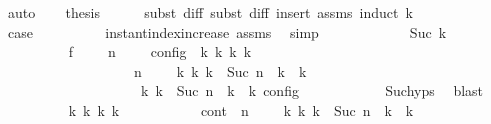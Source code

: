 \begin{isabellebody}
\ auto\isanewline
\ \ \isamarkupfalse%
\ {\isacharquery}thesis\isanewline
\ \ \ \ \isamarkupfalse%
\ {\isacharparenleft}subst\ diff{\isacharcomma}\ subst\ diff{\isacharcomma}\ insert\ assms{\isacharparenleft}{}{\isacharparenright}{\isacharcomma}\ induct\ {\isasymdelta}k{\isacharparenright}\isanewline
\ \ \ \ \ \ \isamarkupfalse%
\ {}\ \ \isamarkupfalse%
\ {\isacharquery}case\isanewline
\ \ \ \ \ \ \ \ \isamarkupfalse%
\ instant{\isacharunderscore}index{\isacharunderscore}increase\ assms{\isacharparenleft}{}{\isacharparenright}\ \isamarkupfalse%
\ simp\isanewline
\ \ \ \ \isamarkupfalse%
\isanewline
\ \ \ \ \ \ \isamarkupfalse%
\ {\isacharparenleft}Suc\ {\isasymdelta}k{\isacharparenright}\isanewline
\ \ \ \ \ \ \ \ \isamarkupfalse%
\ f{}{\isacharcolon}\ {\isacartoucheopen}{\isasymrho}\ {\isasymin}\ {\isasymlbrakk}\ {\isasymGamma}{\isacharcomma}\ n\ {\isasymturnstile}\ {\isasymPsi}\ {\isasymtriangleright}\ {\isasymPhi}\ {\isasymrbrakk}\isactrlsub c\isactrlsub o\isactrlsub n\isactrlsub f\isactrlsub i\isactrlsub g\ {\isasymLongrightarrow}\ {\isasymexists}{\isasymGamma}\isactrlsub k\ {\isasymPsi}\isactrlsub k\ {\isasymPhi}\isactrlsub k\ k{\isachardot}\isanewline
\ \ \ \ \ \ \ \ \ \ \ \ \ \ \ \ \ \ {\isacharparenleft}{\isacharparenleft}{\isasymGamma}{\isacharcomma}\ n\ {\isasymturnstile}\ {\isasymPsi}\ {\isasymtriangleright}\ {\isasymPhi}{\isacharparenright}\ {\isasymhookrightarrow}\isactrlbsup k\isactrlesup \ {\isacharparenleft}{\isasymGamma}\isactrlsub k{\isacharcomma}\ {\isasymdelta}k\ {\isacharplus}\ Suc\ n\ {\isasymturnstile}\ {\isasymPsi}\isactrlsub k\ {\isasymtriangleright}\ {\isasymPhi}\isactrlsub k{\isacharparenright}{\isacharparenright}\isanewline
\ \ \ \ \ \ \ \ \ \ \ \ \ \ \ \ {\isasymand}\ {\isasymrho}\ {\isasymin}\ {\isasymlbrakk}\ {\isasymGamma}\isactrlsub k{\isacharcomma}\ {\isasymdelta}k\ {\isacharplus}\ Suc\ n\ {\isasymturnstile}\ {\isasymPsi}\isactrlsub k\ {\isasymtriangleright}\ {\isasymPhi}\isactrlsub k\ {\isasymrbrakk}\isactrlsub c\isactrlsub o\isactrlsub n\isactrlsub f\isactrlsub i\isactrlsub g{\isacartoucheclose}\isanewline
\ \ \ \ \ \ \ \ \ \ \isamarkupfalse%
\ Suc{\isachardot}hyps\ \isamarkupfalse%
\ blast\isanewline
\ \ \ \ \ \ \ \ \isamarkupfalse%
\ {\isasymGamma}\isactrlsub k\ {\isasymPsi}\isactrlsub k\ {\isasymPhi}\isactrlsub k\ k\isanewline
\ \ \ \ \ \ \ \ \ \ \ cont{\isacharcolon}\ {\isacartoucheopen}{\isacharparenleft}{\isacharparenleft}{\isasymGamma}{\isacharcomma}\ n\ {\isasymturnstile}\ {\isasymPsi}\ {\isasymtriangleright}\ {\isasymPhi}{\isacharparenright}\ {\isasymhookrightarrow}\isactrlbsup k\isactrlesup \ {\isacharparenleft}{\isasymGamma}\isactrlsub k{\isacharcomma}\ {\isasymdelta}k\ {\isacharplus}\ Suc\ n\ {\isasymturnstile}\ {\isasymPsi}\isactrlsub k\ {\isasymtriangleright}\ {\isasymPhi}\isactrlsub k{\isacharparenright}{\isacharparenright}\isanewline

\end{isabellebody}
